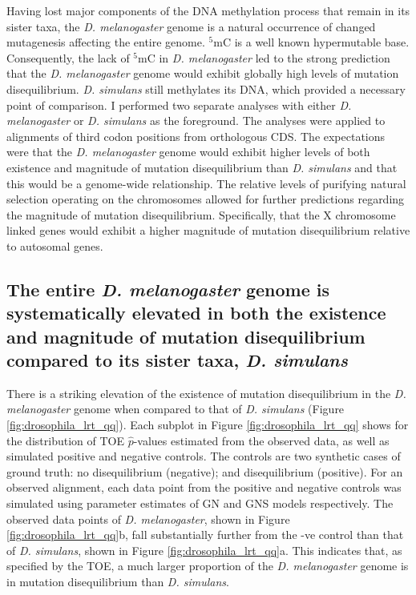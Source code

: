 Having lost major components of the DNA methylation process that remain in its sister taxa, the \textit{D. melanogaster} genome is a natural occurrence of changed mutagenesis affecting the entire genome. $^5$mC is a well known hypermutable base. Consequently, the lack of $^5$mC in
\textit{D. melanogaster} led to the strong prediction that the \textit{D. melanogaster} genome would exhibit globally high levels of mutation disequilibrium. \textit{D. simulans} still methylates its DNA, which provided a necessary point of comparison. I performed two separate analyses with either \textit{D. melanogaster} or \textit{D. simulans} as the foreground. The analyses were applied to alignments of third codon positions from orthologous CDS. The expectations were that the \textit{D. melanogaster} genome would exhibit higher levels of both existence and magnitude of mutation disequilibrium than \textit{D. simulans} and that this would be a genome-wide relationship. The relative levels of purifying natural selection operating on the chromosomes allowed for further predictions regarding the magnitude of mutation disequilibrium. Specifically, that the X chromosome linked genes would exhibit a higher magnitude of mutation disequilibrium relative to autosomal genes. 

\subsection{The entire \textit{D. melanogaster} genome is systematically elevated in both the existence and magnitude of mutation disequilibrium compared to its sister taxa, \textit{D. simulans}}
\label{TOE_drosophila}

There is a striking elevation of the existence of mutation disequilibrium in the \textit{D. melanogaster} genome when compared to that of \textit{D. simulans} (Figure \ref{fig:drosophila_lrt_qq}). Each subplot in Figure \ref{fig:drosophila_lrt_qq} shows for the distribution of TOE $\hat p$-values estimated from the observed data, as well as simulated positive and negative controls. The controls are two synthetic cases of ground truth: no disequilibrium (negative); and disequilibrium (positive). For an observed alignment, each data point from the positive and negative controls was simulated using parameter estimates of GN and GNS models respectively. The observed data points of \textit{D. melanogaster}, shown in Figure \ref{fig:drosophila_lrt_qq}b, fall substantially further from the -ve control than that of \textit{D. simulans}, shown in Figure \ref{fig:drosophila_lrt_qq}a. This indicates that, as specified by the TOE, a much larger proportion of the \textit{D. melanogaster} genome is in mutation disequilibrium than \textit{D. simulans}. 

